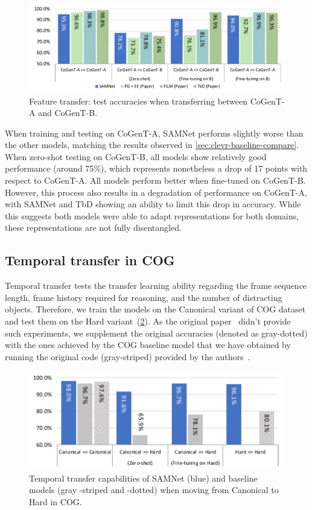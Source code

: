 \begin{figure}[htbp]
	\centering
	\includegraphics[width=\columnwidth]{../img/plots/cogent_feature_transfer_baselines.pdf}
	\caption{Feature transfer: test accuracies when transferring between CoGenT-A and CoGenT-B.}
	\label{fig:CoGenT-B-results}
\end{figure}

When training and testing on CoGenT-A, SAMNet performs slightly worse than the other models, matching the results observed in \cref{sec:clevr-baseline-compare}.
When zero-shot testing on CoGenT-B, all models show relatively good performance (around 75\%), which represents nonetheless a drop of 17 points with respect to CoGenT-A.
All models perform better when fine-tuned on CoGenT-B.
However, this process also results in a degradation of performance on CoGenT-A, with SAMNet and TbD showing an ability to limit this drop in accuracy.
While this suggests both models were able to adapt representations for both domains, these representations are not fully disentangled.

\subsection{Temporal transfer in COG}
\label{sec:temporal}

Temporal transfer tests the transfer learning ability regarding the frame sequence length, frame history required for reasoning, and the number of distracting objects.
Therefore, we train the models on the Canonical variant of COG dataset and test them on the Hard variant~(\cref{fig:samnet_cog_overall_transfer}).
As the original paper~\cite{yang2018dataset} didn't provide such experiments, we supplement the original accuracies (denoted as gray-dotted) with the ones achieved by the COG baseline model that we have obtained by running the original code (gray-striped) provided by the authors~\cite{yang2018implement}.

\begin{figure}[htbp]
	\centering
	\includegraphics[width=0.8\columnwidth]{../img/plots/cog_temporal_transfer_baselines.pdf}
	\caption{Temporal transfer capabilities of SAMNet (blue) and baseline models (gray -striped and -dotted) when moving from Canonical to Hard  in COG.}
	\label{fig:samnet_cog_overall_transfer}
\end{figure}

